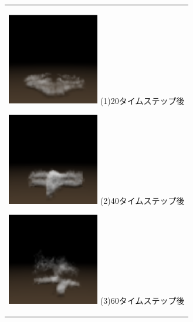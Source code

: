 \documentclass[submit,techrep]{ipsj}
\begin{document}
\begin{figure}[t]
  \begin{center}
    \begin{tabular}{c}

      \begin{minipage}{0.25\hsize}
        \begin{center}
          \includegraphics[clip, width=4cm]{./render_20.eps}
          \hspace{1.6cm} (1)20タイムステップ後
        \end{center}
      \end{minipage}

      \begin{minipage}{0.25\hsize}
        \begin{center}
          \includegraphics[clip, width=4cm]{./render_40.eps}
          \hspace{1.6cm} (2)40タイムステップ後
        \end{center}
      \end{minipage}

      \begin{minipage}{0.25\hsize}
        \begin{center}
          \includegraphics[clip, width=4cm]{./render_60.eps}
          \hspace{1.6cm} (3)60タイムステップ後
        \end{center}
      \end{minipage}


\end{tabular}
\end{center}
\end{figure}
\end{document}
